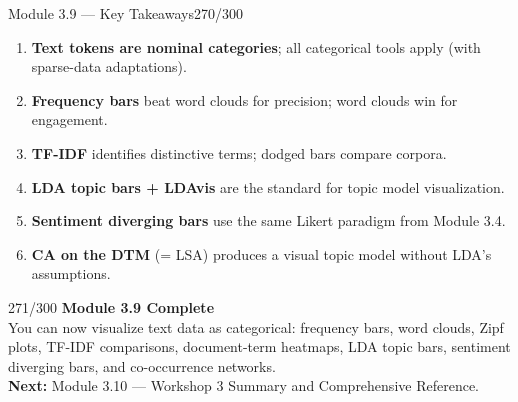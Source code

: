 \documentclass[10pt]{beamer}
\newcommand{\smark}[1]{\hfill{\scriptsize\color{codegray}#1}}
\begin{document}
\begin{frame}{Module 3.9 --- Key Takeaways}\smark{270/300}
\begin{enumerate}
    \item \textbf{Text tokens are nominal categories}; all categorical tools apply (with sparse-data adaptations).
    \item \textbf{Frequency bars} beat word clouds for precision; word clouds win for engagement.
    \item \textbf{TF-IDF} identifies distinctive terms; dodged bars compare corpora.
    \item \textbf{LDA topic bars + LDAvis} are the standard for topic model visualization.
    \item \textbf{Sentiment diverging bars} use the same Likert paradigm from Module 3.4.
    \item \textbf{CA on the DTM} (= LSA) produces a visual topic model without LDA's assumptions.
\end{enumerate}
\end{frame}

\begin{frame}{}\smark{271/300}
\centering\vspace{1.5cm}
{\Large\textbf{Module 3.9 Complete}}\\[0.5cm]
You can now visualize text data as categorical: frequency bars, word clouds, Zipf plots, TF-IDF comparisons, document-term heatmaps, LDA topic bars, sentiment diverging bars, and co-occurrence networks.\\[0.5cm]
\textbf{Next:} Module 3.10 --- Workshop 3 Summary and Comprehensive Reference.
\end{frame}

\end{document}
